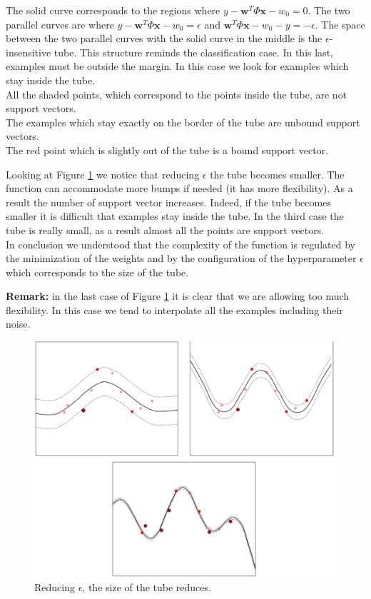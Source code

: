 The solid curve corresponds to the regions where $y - \pmb{w}^T \Phi{\pmb{x}} - w_0 = 0$. The two parallel curves are where $y - \pmb{w}^T \Phi{\pmb{x}} - w_0 = \epsilon$ and $\pmb{w}^T \Phi{\pmb{x}} - w_0 - y = - \epsilon$. The space between the two parallel curves with the solid curve in the middle is the $\epsilon$-insensitive tube. This structure reminds the classification case. In this last, examples must be outside the margin. In this case we look for examples which stay inside the tube.\\ All the shaded points, which correspond to the points inside the tube, are not support vectors. \\ The examples which stay exactly on the border of the tube are unbound support vectors. \\ The red point which is slightly out of the tube is a bound support vector. \newline

Looking at Figure \ref{fig:svm_regression_decreasing_eps} we notice that reducing $\epsilon$ the tube becomes smaller. The function can accommodate more bumps if needed (it has more flexibility). As a result the number of support vector increases. Indeed, if the tube becomes smaller it is difficult that examples stay inside the tube. In the third case the tube is really small, as a result almost all the points are support vectors. \\
In conclusion we understood that the complexity of the function is regulated by the minimization of the weights and by the configuration of the hyperparameter $\epsilon$ which corresponds to the size of the tube. \newline

\textbf{Remark:} in the last case of Figure \ref{fig:svm_regression_decreasing_eps} it is clear that we are allowing too much flexibility. In this case we tend to interpolate all the examples including their noise.

\begin{figure}
    \centering
    \includegraphics[width=\textwidth]{images/svm_regression_example_decreasing_epsilon.png}
    \caption{Reducing $\epsilon$, the size of the tube reduces.}
    \label{fig:svm_regression_decreasing_eps}
\end{figure}